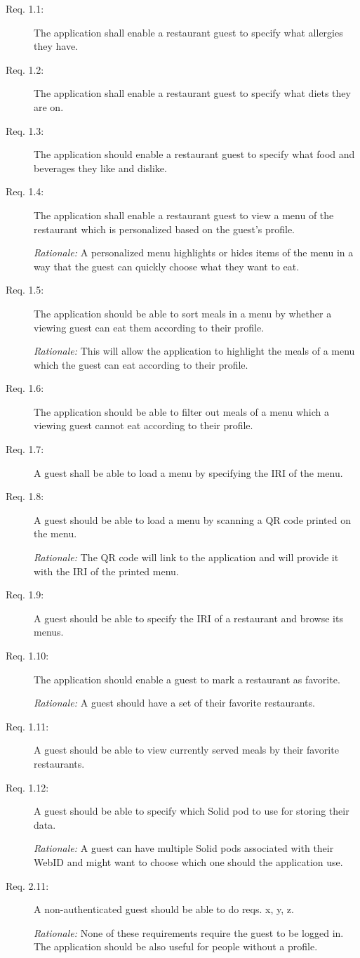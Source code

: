 \begin{description}
    \item [Req. 1.1:] The application shall enable a restaurant guest to specify what allergies they have.
    \item [Req. 1.2:] The application shall enable a restaurant guest to specify what diets they are on.
    \item [Req. 1.3:] The application should enable a restaurant guest to specify what food and beverages they like and dislike.
    \item [Req. 1.4:] The application shall enable a restaurant guest to view a menu of the restaurant which is personalized based on the guest's profile.

    \emph{Rationale:} A personalized menu highlights or hides items of the menu in a way that the guest can quickly choose what they want to eat. 
    \item [Req. 1.5:] The application should be able to sort meals in a menu by whether a viewing guest can eat them according to their profile.

    \emph{Rationale:} This will allow the application to highlight the meals of a menu which the guest can eat according to their profile.
    \item [Req. 1.6:] The application should be able to filter out meals of a menu which a viewing guest cannot eat according to their profile.
    \item [Req. 1.7:] A guest shall be able to load a menu by specifying the IRI of the menu.
    \item [Req. 1.8:] A guest should be able to load a menu by scanning a QR code printed on the menu.

    \emph{Rationale:} The QR code will link to the application and will provide it with the IRI of the printed menu.
    \item [Req. 1.9:] A guest should be able to specify the IRI of a restaurant and browse its menus.
    \item [Req. 1.10:] The application should enable a guest to mark a restaurant as favorite.
    
    \emph{Rationale:} A guest should have a set of their favorite restaurants.
    \item [Req. 1.11:] A guest should be able to view currently served meals by their favorite restaurants.
    \item [Req. 1.12:] A guest should be able to specify which Solid pod to use for storing their data.

    \emph{Rationale:} A guest can have multiple Solid pods associated with their WebID and might want to choose which one should the application use.
    \item [Req. 2.11:] A non-authenticated guest should be able to do reqs. x, y, z. 

    \emph{Rationale:} None of these requirements require the guest to be logged in. The application should be also useful for people without a profile.
\end{description}

